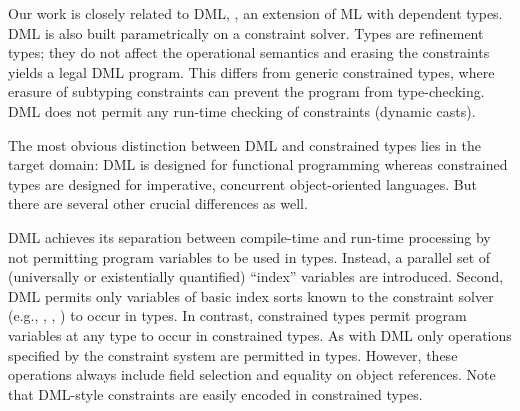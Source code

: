 Our work is closely related to DML, \cite{xi99dependent}, an
extension of ML with dependent types. DML is also built
parametrically on a constraint solver. Types are refinement types;
they do not affect the operational semantics and erasing the
constraints yields a legal DML program.  This differs from generic constrained
types, where erasure of subtyping constraints can prevent the program from
type-checking.
DML does not permit any run-time checking of constraints
(dynamic casts).

The most obvious distinction between DML and constrained types
lies in the target
domain: DML is designed for functional programming
whereas constrained types are designed for imperative, concurrent
object-oriented languages. 
But there are several other
crucial differences as well.

DML achieves its separation between compile-time and run-time processing
by not permitting program
variables to be used in types. Instead, a parallel set of (universally
or existentially quantified) ``index'' variables are
introduced.
%
Second, DML permits only variables of basic index sorts known to
the constraint solver (e.g., , , ) to
occur in types. In contrast, constrained types permit program
variables at any type to occur in constrained types. As with DML
only operations specified by the constraint system are permitted in
types. However, these operations always include field selection and
equality on object references.  Note that DML-style constraints are easily
encoded in constrained types.





